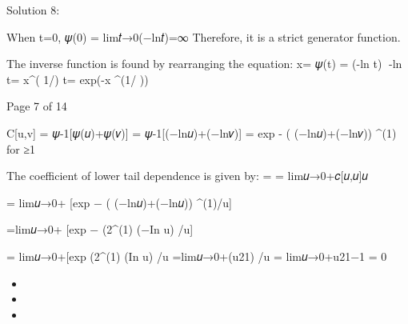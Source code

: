 \documentclass[a4paper,12pt]{article}
\begin{document}


Solution 8:
\item 
When t=0, 𝜓(0) = lim𝑡→0(−ln𝑡)\alpha =∞
Therefore, it is a strict generator function.

The inverse function is found by rearranging the equation:
x= 𝜓(t) = (-ln t)
-ln t= x^( 1/\alpha)
t= exp(-x ^(1/ \alpha))

Page 7 of 14

\item  
C[u,v] = 𝜓-1[𝜓(𝑢)+𝜓(𝑣)]
= 𝜓-1[(−ln𝑢)\alpha+(−ln𝑣)\alpha]
= exp {- ( (−ln𝑢)\alpha+(−ln𝑣)\alpha ) ^(1\alpha)} for \alpha≥1

The coefficient of lower tail dependence is given by:
\lambdaL = = lim𝑢→0+𝑐[𝑢,𝑢]𝑢

= lim𝑢→0+ [exp { − ( (−ln𝑢)\alpha+(−ln𝑢)\alpha ) ^(1\alpha)}/u]

=lim𝑢→0+ [exp { − (2^(1\alpha) (−In u) }/u]

= lim𝑢→0+[exp { (2^(1\alpha) (In u) }/u
 =lim𝑢→0+(u21\alpha) /u
= lim𝑢→0+u21\alpha−1
= 0 

\begin{itemize}
\item 
\item 
\item 
\end{itemize}
\end{document}
